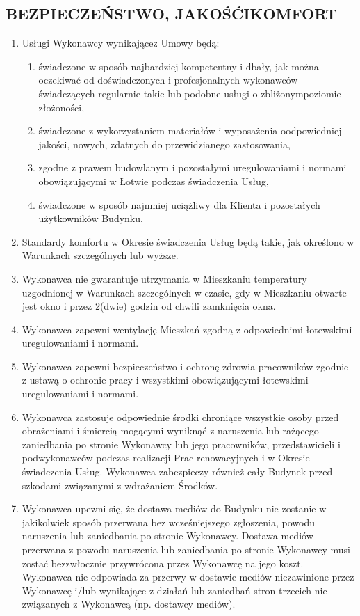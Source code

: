 \begin{multicols}{2}
\subsection{BEZPIECZEŃSTWO, JAKOŚĆIKOMFORT}
\begin{enumerate}
	\item Usługi  Wykonawcy  wynikającez Umowy będą:
	\begin{enumerate}
		\item świadczone  w  sposób  najbardziej kompetentny i dbały, jak można oczekiwać od  doświadczonych  i  profesjonalnych wykonawców  świadczących  regularnie takie  lub  podobne  usługi  o  zbliżonympoziomie złożoności,
		\item świadczone  z  wykorzystaniem materiałów i wyposażenia oodpowiedniej jakości,   nowych,   zdatnych   do przewidzianego zastosowania,
		\item zgodne   z  prawem  budowlanym  i pozostałymi  uregulowaniami  i  normami obowiązującymi  w  Łotwie  podczas świadczenia Usług,
		\item świadczone  w  sposób  najmniej uciążliwy  dla  Klienta  i  pozostałych użytkowników Budynku.
	\end{enumerate}
	\item Standardy    komfortu    w    Okresie świadczenia  Usług  będą  takie,  jak określono w Warunkach szczególnych lub wyższe.
	\item Wykonawca nie gwarantuje utrzymania    w    Mieszkaniu temperatury uzgodnionej w Warunkach szczególnych w czasie, gdy w Mieszkaniu otwarte jest okno i przez 2(dwie) godzin od chwili zamknięcia okna.
	\item Wykonawca  zapewni  wentylację Mieszkań  zgodną  z  odpowiednimi łotewskimi uregulowaniami i normami.
	\item Wykonawca zapewni bezpieczeństwo  i  ochronę  zdrowia pracowników zgodnie z ustawą o ochronie pracy  i  wszystkimi  obowiązującymi łotewskimi uregulowaniami i normami.
	\item Wykonawca zastosuje odpowiednie  środki  chroniące  wszystkie osoby  przed  obrażeniami  i  śmiercią mogącymi  wyniknąć  z  naruszenia    lub rażącego   zaniedbania   po   stronie Wykonawcy  lub  jego  pracowników, przedstawicieli i podwykonawców podczas realizacji  Prac  renowacyjnych  i  w  Okresie świadczenia   Usług.   Wykonawca zabezpieczy  również  cały  Budynek  przed szkodami  związanymi z wdrażaniem Środków.
	\item Wykonawca  upewni  się,  że dostawa mediów do Budynku nie zostanie w  jakikolwiek  sposób  przerwana  bez wcześniejszego  zgłoszenia,  powodu naruszenia    lub    zaniedbania    po    stronie Wykonawcy. Dostawa mediów przerwana z powodu   naruszenia lub   zaniedbania   po stronie   Wykonawcy   musi   zostać bezzwłocznie   przywrócona   przez Wykonawcę na jego koszt. Wykonawca nie odpowiada za przerwy w dostawie mediów niezawinione  przez  Wykonawcę  i/lub wynikające z działań lub zaniedbań stron trzecich nie związanych z Wykonawcą (np. dostawcy mediów).

\end{enumerate}
\end{multicols}
